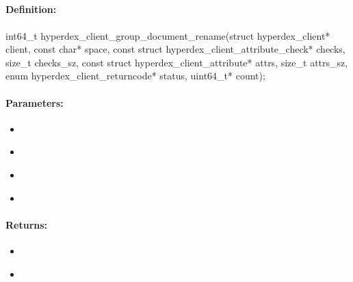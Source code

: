 \pagebreak
\subsection{}
\label{api:c:group_document_rename}


\paragraph{Definition:}
\begin{ccode}
int64_t hyperdex_client_group_document_rename(struct hyperdex_client* client,
        const char* space,
        const struct hyperdex_client_attribute_check* checks, size_t checks_sz,
        const struct hyperdex_client_attribute* attrs, size_t attrs_sz,
        enum hyperdex_client_returncode* status,
        uint64_t* count);
\end{ccode}

\paragraph{Parameters:}
\begin{itemize}[noitemsep]
\item {}\\

\item {}\\

\item {}\\

\item {}\\

\end{itemize}

\paragraph{Returns:}
\begin{itemize}[noitemsep]
\item {}\\

\item {}\\

\end{itemize}

